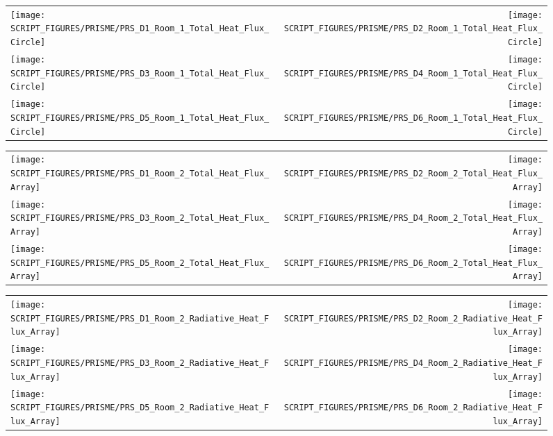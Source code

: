 \begin{figure}[p]
\begin{tabular*}{\textwidth}{l@{\extracolsep{\fill}}r}
\texttt{[image: SCRIPT\_FIGURES/PRISME/PRS\_D1\_Room\_1\_Total\_Heat\_Flux\_Circle]} &
\texttt{[image: SCRIPT\_FIGURES/PRISME/PRS\_D2\_Room\_1\_Total\_Heat\_Flux\_Circle]} \\
\texttt{[image: SCRIPT\_FIGURES/PRISME/PRS\_D3\_Room\_1\_Total\_Heat\_Flux\_Circle]} &
\texttt{[image: SCRIPT\_FIGURES/PRISME/PRS\_D4\_Room\_1\_Total\_Heat\_Flux\_Circle]} \\
\texttt{[image: SCRIPT\_FIGURES/PRISME/PRS\_D5\_Room\_1\_Total\_Heat\_Flux\_Circle]} &
\texttt{[image: SCRIPT\_FIGURES/PRISME/PRS\_D6\_Room\_1\_Total\_Heat\_Flux\_Circle]}
\end{tabular*}
\label{PRISME_Wall_Circle_THF_Room_1}
\end{figure}

\begin{figure}[p]
\begin{tabular*}{\textwidth}{l@{\extracolsep{\fill}}r}
\texttt{[image: SCRIPT\_FIGURES/PRISME/PRS\_D1\_Room\_2\_Total\_Heat\_Flux\_Array]} &
\texttt{[image: SCRIPT\_FIGURES/PRISME/PRS\_D2\_Room\_2\_Total\_Heat\_Flux\_Array]} \\
\texttt{[image: SCRIPT\_FIGURES/PRISME/PRS\_D3\_Room\_2\_Total\_Heat\_Flux\_Array]} &
\texttt{[image: SCRIPT\_FIGURES/PRISME/PRS\_D4\_Room\_2\_Total\_Heat\_Flux\_Array]} \\
\texttt{[image: SCRIPT\_FIGURES/PRISME/PRS\_D5\_Room\_2\_Total\_Heat\_Flux\_Array]} &
\texttt{[image: SCRIPT\_FIGURES/PRISME/PRS\_D6\_Room\_2\_Total\_Heat\_Flux\_Array]}
\end{tabular*}
\label{PRISME_Wall_Array_THF_Room_2}
\end{figure}

\begin{figure}[p]
\begin{tabular*}{\textwidth}{l@{\extracolsep{\fill}}r}
\texttt{[image: SCRIPT\_FIGURES/PRISME/PRS\_D1\_Room\_2\_Radiative\_Heat\_Flux\_Array]} &
\texttt{[image: SCRIPT\_FIGURES/PRISME/PRS\_D2\_Room\_2\_Radiative\_Heat\_Flux\_Array]} \\
\texttt{[image: SCRIPT\_FIGURES/PRISME/PRS\_D3\_Room\_2\_Radiative\_Heat\_Flux\_Array]} &
\texttt{[image: SCRIPT\_FIGURES/PRISME/PRS\_D4\_Room\_2\_Radiative\_Heat\_Flux\_Array]} \\
\texttt{[image: SCRIPT\_FIGURES/PRISME/PRS\_D5\_Room\_2\_Radiative\_Heat\_Flux\_Array]} &
\texttt{[image: SCRIPT\_FIGURES/PRISME/PRS\_D6\_Room\_2\_Radiative\_Heat\_Flux\_Array]}
\end{tabular*}
\label{PRISME_Wall_Array_RHF_Room_2}
\end{figure}

